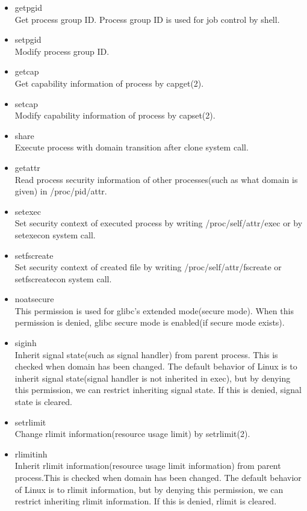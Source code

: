 \documentclass{article}
\begin{document}
\begin{itemize}
 \item getpgid\\
       Get process group ID. Process group ID is used for job control by shell.
 \item	 setpgid\\
       Modify process group ID.
 \item getcap\\
       Get capability information of process by capget(2).
 \item setcap\\
       Modify capability information of process by capset(2).
 \item share\\
       Execute process with domain transition after clone system call. 
 \item getattr\\
       Read process security information of other processes(such as what domain is given) in /proc/pid/attr.
 \item setexec\\
       Set security context of executed process by writing
       /proc/self/attr/exec or by setexecon system call.
 \item setfscreate\\
       Set security context of created file by writing
       /proc/self/attr/fscreate or setfscreatecon system call.
 \item noatsecure\\
       This permission is used for glibc's extended mode(secure mode). When this
       permission is denied, glibc secure mode is enabled(if secure
       mode exists).
 \item siginh\\
       Inherit signal state(such as signal handler) from parent process. This is checked when
       domain has been changed. The default behavior of Linux is to
       inherit signal state(signal handler is not inherited in exec), but by denying this permission, we can
       restrict inheriting signal state. If this is denied, signal state
       is cleared.    

 \item setrlimit\\
       Change rlimit information(resource usage limit) by setrlimit(2).
       
 \item rlimitinh\\
       Inherit rlimit information(resource usage limit information) from
       parent process.This is checked when domain has been changed.  The default behavior of Linux is to
       rlimit information, but by denying this permission, we can
       restrict inheriting rlimit information. If this is denied, rlimit       is cleared.   
 

\end{itemize}
\end{document}
